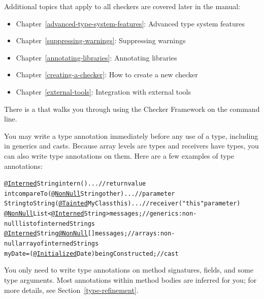 Additional topics that apply to all checkers are covered later in the manual:
\begin{itemize}
\item Chapter~\ref{advanced-type-system-features}: Advanced type system features
\item Chapter~\ref{suppressing-warnings}: Suppressing warnings
\item Chapter~\ref{annotating-libraries}: Annotating libraries
\item Chapter~\ref{creating-a-checker}: How to create a new checker
\item Chapter~\ref{external-tools}: Integration with external tools
\end{itemize}


There is a
that walks you through using the Checker Framework on the
command line.




You may write a type annotation immediately before any
use of a type, including in generics and casts.  Because array levels are
types and receivers have types, you can also write type annotations on
them.  Here are a few examples of type annotations:

\begin{smaller}
\begin{alltt}
  \underline{@Interned} String intern() \ttlcb{} ... \ttrcb{}               // return value
  int compareTo(\underline{@NonNull} String other) \ttlcb{} ... \ttrcb{}    // parameter
  String toString(\underline{@Tainted} MyClass this) \ttlcb{} ... \ttrcb{}  // receiver ("this" parameter)
  \underline{@NonNull} List<\underline{@Interned} String> messages;       // generics:  non-null list of interned Strings
  \underline{@Interned} String \underline{@NonNull} [] messages;          // arrays:  non-null array of interned Strings
  myDate = (\underline{@Initialized} Date) beingConstructed;  // cast
\end{alltt}
\end{smaller}

You only need to write type annotations on method signatures, fields, and some type arguments.
Most annotations within method bodies are inferred for you; for more details,
see  Section~\ref{type-refinement}.

